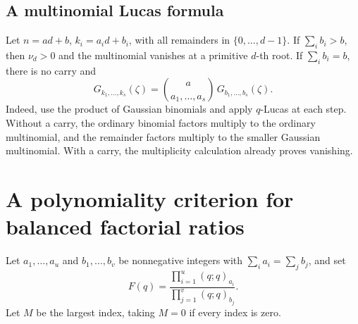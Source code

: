 \documentclass[11pt,a4paper,oneside,openany]{book}
\theoremstyle{definition}
\theoremstyle{remark}
\begin{document}
\subsection{A multinomial Lucas formula}
Let \(n=ad+b\), \(k_i=a_id+b_i\), with all remainders in
\(\{0,\ldots,d-1\}\). If \(\sum_i b_i>b\), then \(\nu_d>0\)
and the multinomial vanishes at a primitive \(d\)-th root. If
\(\sum_i b_i=b\), there is no carry and
\begin{equation}\label{q1:qcc:multinomial-lucas}
 G_{k_1,\ldots,k_s}(\zeta)
 =\binom{a}{a_1,\ldots,a_s}\,
                 G_{b_1,\ldots,b_s}(\zeta).
\end{equation}
Indeed, use the product of Gaussian binomials and apply \(q\)-Lucas at
each step. Without a carry, the ordinary binomial factors multiply to the
ordinary multinomial, and the remainder factors multiply to the smaller
Gaussian multinomial. With a carry, the multiplicity calculation already
proves vanishing.

\section{A polynomiality criterion for balanced factorial ratios}
Let \(a_1,\ldots,a_u\) and \(b_1,\ldots,b_v\) be nonnegative integers
with \(\sum_i a_i=\sum_j b_j\), and set
\[
 F(q)=\frac{\prod_{i=1}^{u}(q;q)_{a_i}}
                 {\prod_{j=1}^{v}(q;q)_{b_j}}.
\]
Let \(M\) be the largest index, taking \(M=0\) if every index is zero.
\end{document}
